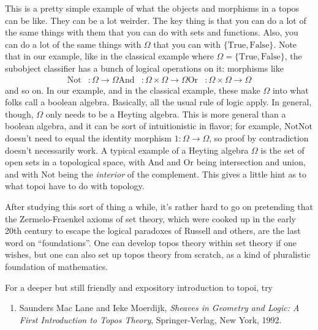 \documentclass{article}
\def\tightlist{}
\begin{document}
This is a pretty simple example of what the objects and morphisms in a
topos can be like. They can be a lot weirder. The key thing is that you
can do a lot of the same things with them that you can do with sets and
functions. Also, you can do a lot of the same things with \(\Omega\)
that you can with \(\{\mathrm{True}, \mathrm{False}\}\). Note that in
our example, like in the classical example where
\(\Omega = \{\mathrm{True}, \mathrm{False}\}\), the subobject classifier
has a bunch of logical operations on it: morphisms like \[
  \begin{aligned}
    \mathrm{Not}&\colon \Omega \to \Omega
    \mathrm{And}&\colon \Omega \times \Omega \to \Omega
    \mathrm{Or}&\colon \Omega \times \Omega \to \Omega
  \end{aligned}
\] and so on. In our example, and in the classical example, these make
\(\Omega\) into what folks call a boolean algebra. Basically, all the usual
rule of logic apply. In general, though, \(\Omega\) only needs to be a
Heyting algebra. This is more general than a boolean algebra, and it can
be sort of intuitionistic in flavor; for example,
\(\mathrm{Not} \mathrm{Not}\) doesn't need to equal the identity
morphism \(1\colon \Omega \to \Omega\), so proof by contradiction
doesn't necessarily work. A typical example of a Heyting algebra
\(\Omega\) is the set of open sets in a topological space, with
\(\mathrm{And}\) and \(\mathrm{Or}\) being intersection and union, and
with \(\mathrm{Not}\) being the \emph{interior} of the complement. This
gives a little hint as to what topoi have to do with topology.

After studying this sort of thing a while, it's rather hard to go on
pretending that the Zermelo-Fraenkel axioms of set theory, which were
cooked up in the early 20th century to escape the logical paradoxes of
Russell and others, are the last word on ``foundations''. One can
develop topos theory within set theory if one wishes, but one can also
set up topos theory from scratch, as a kind of pluralistic foundation of
mathematics.

For a deeper but still friendly and expository introduction to topoi,
try

\begin{enumerate}
\def\labelenumi{\arabic{enumi})}
\setcounter{enumi}{1}
\tightlist
\item
  Saunders Mac Lane and Ieke Moerdijk, \emph{Sheaves in Geometry and
  Logic: A First Introduction to Topos Theory}, Springer-Verlag, New
  York, 1992.
\end{enumerate}
\end{document}
